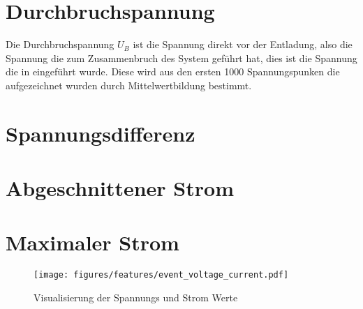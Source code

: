 \section{Durchbruchspannung}
\label{sec:breakdownvoltage}
Die Durchbruchspannung \(U_B\) ist die Spannung direkt vor der Entladung, also die Spannung die zum Zusammenbruch des System geführt hat, dies ist die Spannung die in  eingeführt wurde. Diese wird aus den ersten 1000 Spannungspunken die aufgezeichnet wurden durch Mittelwertbildung bestimmt. 

\section{Spannungsdifferenz}
\label{sec:voltage_drop}

\section{Abgeschnittener Strom}
\label{sec:cutoffcurrent}

\section{Maximaler Strom}
\label{sec:maxcurrent}

\begin{figure}[H]
  \centering
  \texttt{[image: figures/features/event\_voltage\_current.pdf]}
  \caption{Visualisierung der Spannungs und Strom Werte}
  \label{fig:event_voltage_current}
\end{figure}






